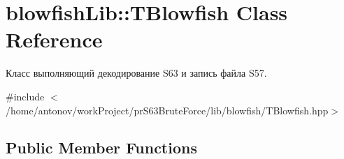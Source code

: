 \hypertarget{classblowfish_lib_1_1_t_blowfish}{}\section{blowfish\+Lib\+:\+:T\+Blowfish Class Reference}
\label{classblowfish_lib_1_1_t_blowfish}


Класс выполняющий декодирование S63 и запись файла S57.  




{\ttfamily \#include $<$/home/antonov/work\+Project/pr\+S63\+Brute\+Force/lib/blowfish/\+T\+Blowfish.\+hpp$>$}

\subsection*{Public Member Functions}
